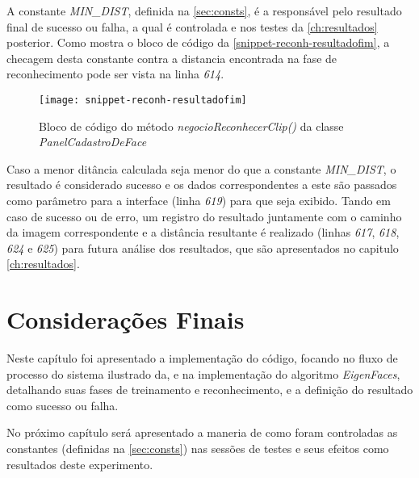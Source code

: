 A constante \textit{MIN\_DIST}, definida na \autoref{sec:consts}, é a responsável pelo resultado final de sucesso ou falha, a qual é controlada e nos testes da \autoref{ch:resultados} posterior. Como mostra o bloco de código da \autoref{snippet-reconh-resultadofim}, a checagem desta constante contra a distancia encontrada na fase de reconhecimento pode ser vista na linha \textit{614}.

\begin{figure}[h]
	\centering
	\texttt{[image: snippet-reconh-resultadofim]}
	\caption{Bloco de código do método \textit{negocioReconhecerClip()} da classe \textit{PanelCadastroDeFace}}
	\label{snippet-reconh-resultadofim}
\end{figure}

Caso a menor ditância calculada seja menor do que a constante \textit{MIN\_DIST}, o resultado é considerado sucesso e os dados correspondentes a este são passados como parâmetro para a interface (linha \textit{619}) para que seja exibido. Tando em caso de sucesso ou de erro, um registro do resultado juntamente com o caminho da imagem correspondente e a distância resultante é realizado (linhas \textit{617}, \textit{618}, \textit{624} e \textit{625}) para futura análise dos resultados, que são apresentados no capitulo \autoref{ch:resultados}.



\section{Considerações Finais}\label{sec:consfin-impl}
Neste capítulo foi apresentado a implementação do código, focando no fluxo de processo do sistema ilustrado da, e na implementação do algoritmo \textit{EigenFaces}, detalhando suas fases de treinamento e reconhecimento, e a definição do resultado como sucesso ou falha.

No próximo capítulo será apresentado a maneria de como foram controladas as constantes (definidas na \autoref{sec:consts}) nas sessões de testes e seus efeitos como resultados deste experimento.



%

